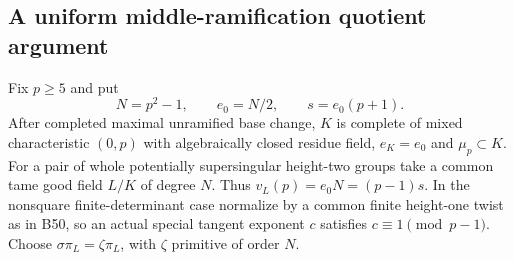 \subsection{A uniform middle-ramification quotient argument}

Fix $p\ge5$ and put
\[
 N=p^2-1,\qquad e_0=N/2,\qquad s=e_0(p+1).
                                                        \tag{B-RD66.1}
\]
After completed maximal unramified base change, $K$ is complete of
mixed characteristic $(0,p)$ with algebraically closed residue field,
$e_K=e_0$ and $\mu_p\subset K$. For a pair of whole potentially
supersingular height-two groups take a common tame good field
$L/K$ of degree $N$. Thus $v_L(p)=e_0N=(p-1)s$.
In the nonsquare finite-determinant case normalize by a common
finite height-one twist as in B50, so an actual special tangent
exponent $c$ satisfies $c\equiv1\pmod{p-1}$. Choose
$\sigma\pi_L=\zeta\pi_L$, with $\zeta$ primitive of order $N$.

